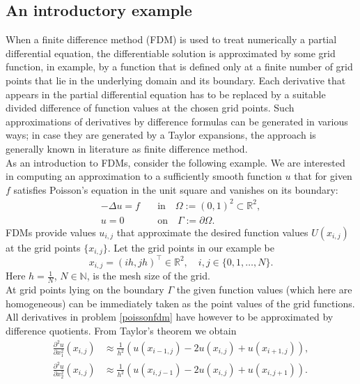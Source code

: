 \documentclass[%
    corpo=11pt,
    twoside,
    stile=classica,
    oldstyle,
    autoretitolo,
    tipotesi=magistrale,
    greek,
    evenboxes,
    english
]{toptesi}
\begin{document}
\begin{appendices}
\section{An introductory example}
When a finite difference method (FDM) is used to treat numerically a partial differential equation, the differentiable solution is approximated by some grid function, in example, by a function that is defined only at a finite number of grid points that lie in the underlying domain and its boundary. Each derivative that appears in the partial differential equation has to be replaced
by a suitable divided difference of function values at the chosen grid points. Such approximations of derivatives by difference formulas can be generated in various ways; in case they are generated by a Taylor expansions, the approach is generally known in literature as finite difference method. \\
As an introduction to FDMs, consider the following example. We are interested in computing an approximation to a sufficiently
smooth function $u$ that for given $f$ satisfies Poisson’s equation in the unit square and vanishes on its boundary:
\begin{align}
\label{poissonfdm}
-\Delta u = f \quad &\text{in} \quad \Omega := (0,1)^2 \subset \mathbb{R}^2, \nonumber \\
u = 0 \quad &\text{on} \quad \Gamma := \partial \Omega.
\end{align}
FDMs provide values $u_{i,j}$ that approximate the desired function values $U(x_{i,j})$ at the grid points $\{x_{i,j}\}$. Let the grid points in our example be 
\begin{equation}
x_{i,j} = (ih, jh)^{\intercal} \in \mathbb{R}^2, \quad i,j \in \{0,1,\dots, N\}.
\end{equation}
Here $h = \frac{1}{N}$, $N \in \mathbb{N}$, is the mesh size of the grid. \\
At grid points lying on the boundary $\Gamma$ the given function values (which here are homogeneous) can be immediately taken as the point values of the grid functions. All derivatives in problem \eqref{poissonfdm} have however to be approximated by difference quotients. From Taylor's theorem we obtain
\begin{align}
\frac{\partial^2u}{\partial x_1^2}(x_{i,j}) &\approx \frac{1}{h^2}\left(u(x_{i-1,j}) -2u(x_{i,j}) + u(x_{i+1,j}) \right), \\
\frac{\partial^2u}{\partial x_2^2}(x_{i,j}) &\approx \frac{1}{h^2}\left(u(x_{i,j-1}) -2u(x_{i,j}) + u(x_{i,j+1}) \right).
\end{align}

\end{appendices}
\end{document}
